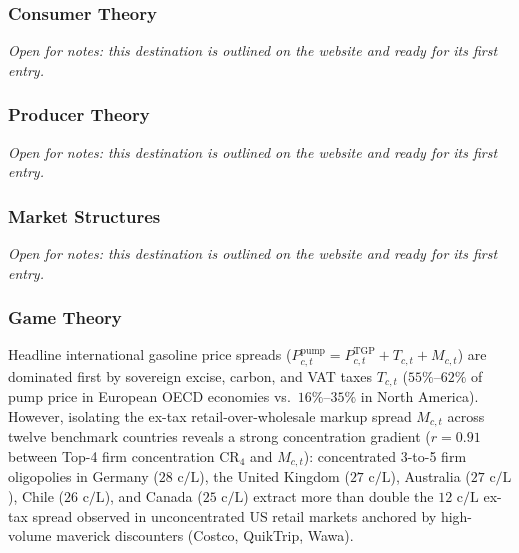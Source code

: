 \documentclass{article}
\newcounter{subsubsubsection}[subsubsection]
\begin{document}
\newpage

\subsubsection{Consumer Theory}\label{sec:consumer-theory}
\textit{Open for notes: this destination is outlined on the website and ready for its first entry.}

\subsubsection{Producer Theory}\label{sec:producer-theory}
\textit{Open for notes: this destination is outlined on the website and ready for its first entry.}

\subsubsection{Market Structures}\label{sec:market-structures}
\textit{Open for notes: this destination is outlined on the website and ready for its first entry.}

\subsubsection{Game Theory}\label{sec:game-theory}

Headline international gasoline price spreads ($P_{c,t}^{\text{pump}} = P_{c,t}^{\text{TGP}} + T_{c,t} + M_{c,t}$) are dominated first by sovereign excise, carbon, and VAT taxes $T_{c,t}$ ($55\%$--$62\%$ of pump price in European OECD economies vs.\ $16\%$--$35\%$ in North America). However, isolating the ex-tax retail-over-wholesale markup spread $M_{c,t}$ across twelve benchmark countries reveals a strong concentration gradient ($r = 0.91$ between Top-4 firm concentration $\text{CR}_4$ and $M_{c,t}$): concentrated 3-to-5 firm oligopolies in Germany ($28\text{ c/L}$), the United Kingdom ($27\text{ c/L}$), Australia ($27\text{ c/L}$), Chile ($26\text{ c/L}$), and Canada ($25\text{ c/L}$) extract more than double the $12\text{ c/L}$ ex-tax spread observed in unconcentrated US retail markets anchored by high-volume maverick discounters (Costco, QuikTrip, Wawa).
\end{document}
